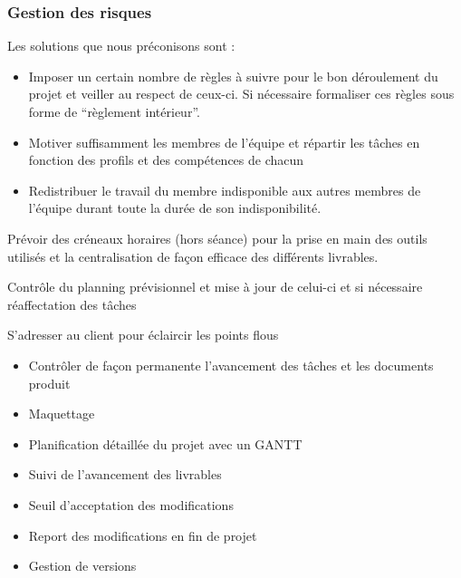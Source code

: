 \subsubsection{Gestion des risques}

\setcounter{solutions}{0}

\newcommand{\solution}[1]{
    \addtocounter{solutions}{1}
    \item[S\thesolutions]{\indent#1}
}

Les solutions que nous préconisons sont :
\begin{description}
    \solution{
        \begin{itemize}
            \item Imposer un certain nombre de règles à suivre pour le bon déroulement du projet et veiller au respect de ceux-ci. Si nécessaire formaliser ces règles sous forme de “règlement intérieur”.
            \item Motiver suffisamment les membres de l’équipe  et répartir les tâches en fonction des profils et des compétences de chacun
            \item Redistribuer le travail du membre indisponible aux autres membres de l’équipe durant toute la durée de son indisponibilité.
        \end{itemize}}
    \solution{
        Prévoir des créneaux horaires (hors séance) pour la prise en main des outils utilisés  et la centralisation de façon efficace des différents livrables.}

    \solution{
        Contrôle du planning prévisionnel et mise à jour de celui-ci et si nécessaire réaffectation des tâches}
    \solution{
        S’adresser au client pour éclaircir les points flous}
    \solution{
        \begin{itemize}
            \item Contrôler de façon permanente l’avancement des tâches et les documents produit
            \item Maquettage
        \end{itemize}}
    \solution{
        \begin{itemize}
            \item Planification détaillée du projet avec un GANTT
            \item Suivi de l’avancement des livrables
        \end{itemize}}
    \solution{
        \begin{itemize}
            \item Seuil d’acceptation des modifications
            \item Report des modifications en fin de projet
            \item Gestion de versions
        \end{itemize}}
\end{description}        



